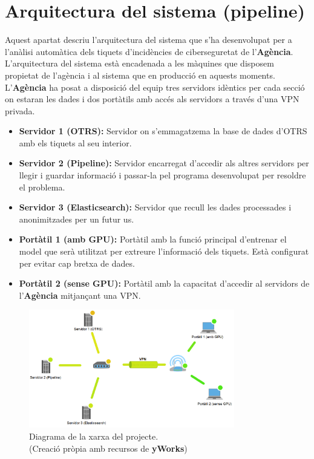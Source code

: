 \section{Arquitectura del sistema (pipeline)}
Aquest apartat descriu l'arquitectura del sistema que s'ha desenvolupat per a l'anàlisi automàtica dels tiquets d'incidències de ciberseguretat de l'\textbf{Agència}. L'arquitectura del sistema està encadenada a les màquines que disposem propietat de l'agència i al sistema que en producció en aquests moments. L'\textbf{Agència} ha posat a disposició del equip tres servidors idèntics per cada secció on estaran les dades i dos portàtils amb accés als servidors a través d'una VPN privada.

\begin{itemize}
     \item \textbf{Servidor 1 (OTRS):} Servidor on s'emmagatzema la base de dades d'OTRS amb els tiquets al seu interior.
     \item \textbf{Servidor 2 (Pipeline):} Servidor encarregat d'accedir als altres servidors per llegir i guardar informació i passar-la pel programa desenvolupat per resoldre el problema.
     \item \textbf{Servidor 3 (Elasticsearch):} Servidor que recull les dades processades i anonimitzades per un futur us.
\end{itemize}

\begin{itemize}
     \item \textbf{Portàtil 1 (amb GPU):} Portàtil amb la funció principal d'entrenar el model que serà utilitzat per extreure l'informació dels tiquets. Està configurat per evitar cap bretxa de dades.
     \item \textbf{Portàtil 2 (sense GPU):} Portàtil amb la capacitat d'accedir al servidors de l'\textbf{Agència} mitjançant una VPN.
\end{itemize}

\begin{figure}[H]
     \centering
     \includegraphics[width=0.8\textwidth]{network.png}
     \caption{Diagrama de la xarxa del projecte. \\ (Creació pròpia amb recursos de \textbf{yWorks})}
     \label{fig:network}
\end{figure}

